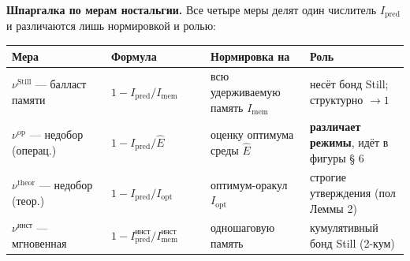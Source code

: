\documentclass[pdflatex,sn-mathphys-ay]{sn-jnl}
\begin{document}
\textbf{Шпаргалка по мерам ностальгии.} Все четыре меры делят один числитель \(I_{\text{pred}}\) и различаются лишь нормировкой и ролью:



\begin{center}\small
\begin{tabular}{@{} >{\raggedright\arraybackslash}p{0.2500\linewidth} >{\raggedright\arraybackslash}p{0.2500\linewidth} >{\raggedright\arraybackslash}p{0.2500\linewidth} >{\raggedright\arraybackslash}p{0.2500\linewidth}@{}}
\toprule

\begin{minipage}[b]{\linewidth}\raggedright

Мера

\end{minipage} & \begin{minipage}[b]{\linewidth}\raggedright

Формула

\end{minipage} & \begin{minipage}[b]{\linewidth}\raggedright

Нормировка на

\end{minipage} & \begin{minipage}[b]{\linewidth}\raggedright

Роль

\end{minipage} \\

\midrule

\(\nu^{\text{Still}}\) --- балласт памяти & \(1 - I_{\text{pred}}/I_{\text{mem}}\) & всю удерживаемую память \(I_{\text{mem}}\) & несёт бонд Still; структурно \(\to 1\) \\

\(\nu^{\text{op}}\) --- недобор (операц.) & \(1 - I_{\text{pred}}/\hat E\) & оценку оптимума среды \(\hat E\) & \textbf{различает режимы}, идёт в фигуры § 6 \\

\(\nu^{\text{theor}}\) --- недобор (теор.) & \(1 - I_{\text{pred}}/I_{\text{opt}}\) & оптимум-оракул \(I_{\text{opt}}\) & строгие утверждения (пол Леммы 2) \\

\(\nu^{\text{инст}}\) --- мгновенная & \(1 - I_{\text{pred}}^{\text{инст}}/I_{\text{mem}}^{\text{инст}}\) & одношаговую память & кумулятивный бонд Still (2-кум) \\

\bottomrule
\end{tabular}
\end{center}
\end{document}

